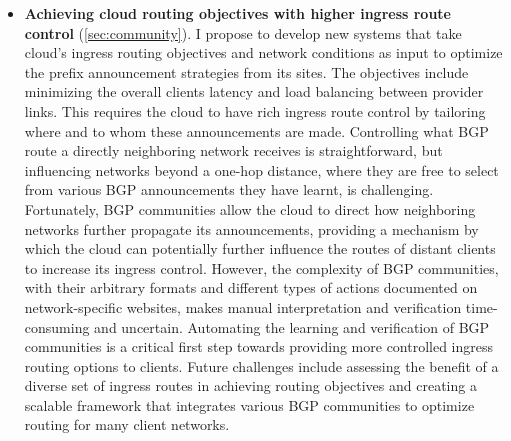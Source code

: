 \documentclass[sigconf,nonacm,screen,letterpaper,9pt]{acmart}
\begin{document}
\begin{itemize}[leftmargin=*]
\item 
\textbf{Achieving cloud routing objectives with higher ingress route control} (\cref{sec:community}).
I propose to develop new systems that take cloud's ingress routing objectives and network conditions as input to optimize the prefix announcement strategies from its sites. The objectives include minimizing the overall clients latency and load balancing between provider links. This requires the cloud to have rich ingress route control by tailoring where and to whom these announcements are made. Controlling what BGP route a directly neighboring network receives is straightforward, but influencing networks beyond a one-hop distance, where they are free to select from various BGP announcements they have learnt, is challenging. Fortunately, BGP communities allow the cloud to direct how neighboring networks further propagate its announcements, providing a mechanism by which the cloud can potentially further influence the routes of distant clients to increase its ingress control.  However, the complexity of BGP communities, with their arbitrary formats and different types of actions documented on network-specific websites, makes manual interpretation and verification time-consuming and uncertain.  Automating the learning and verification of BGP communities is a critical first step towards providing more controlled ingress routing options to clients. Future challenges include assessing the benefit of a diverse set of ingress routes in achieving routing objectives and creating a scalable framework that integrates various BGP communities to optimize routing for many client networks. 




 
\end{itemize}
\end{document}
